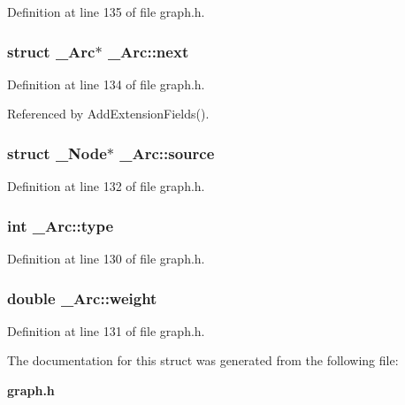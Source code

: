 Definition at line 135 of file graph.h.
\subsubsection{\setlength{\rightskip}{0pt plus 5cm}struct \bf{\_\-Arc}$\ast$ \bf{\_\-Arc::next}}\label{struct__Arc_7e225beaddc2e6e52dfec06976e1274c}




Definition at line 134 of file graph.h.

Referenced by Add\-Extension\-Fields().
\subsubsection{\setlength{\rightskip}{0pt plus 5cm}struct \bf{\_\-Node}$\ast$ \bf{\_\-Arc::source}}\label{struct__Arc_709e2e48eea3dcf31d7c6132fd8f9794}




Definition at line 132 of file graph.h.
\subsubsection{\setlength{\rightskip}{0pt plus 5cm}int \bf{\_\-Arc::type}}\label{struct__Arc_ebab46f709f617f37e45fdee8f0977ab}




Definition at line 130 of file graph.h.
\subsubsection{\setlength{\rightskip}{0pt plus 5cm}double \bf{\_\-Arc::weight}}\label{struct__Arc_537251c4a3b1e385c8d516fb70370a64}




Definition at line 131 of file graph.h.

The documentation for this struct was generated from the following file:\begin{CompactItemize}
\item 
\bf{graph.h}\end{CompactItemize}
